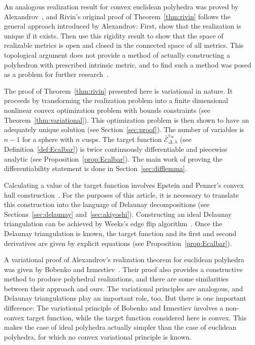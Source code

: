 \documentclass[a4paper, 11pt]{article}
\newcommand{\Ecal}{\mathcal{E}}
\newcommand{\Ecalbar}{\bar{\Ecal}}
\theoremstyle{plain}
\theoremstyle{definition}
\begin{document}
An analogous realization result for convex euclidean polyhedra was
proved by Alexandrov~\cite[pp.~99--100]{alexandrov05:_convex}, and
Rivin's original proof of Theorem~\ref{thm:rivin} follows the general
approach introduced by Alexandrov: First, show that the realization is
unique if it exists. Then use this rigidity result to show that the
space of realizable metrics is open and closed in the connected space
of all metrics. This topological argument does not provide a method of
actually constructing a polyhedron with prescribed intrinsic metric,
and to find such a method was posed as a problem for further
research~\cite{rivin94:_intrin}.

The proof of Theorem~\ref{thm:rivin} presented here is variational in nature. It proceeds by
transforming the realization problem into a finite dimensional
nonlinear convex optimization problem with bounds constraints (see
Theorem~\ref{thm:variational}). This optimization problem is then
shown to have an adequately unique solution (see Section~\ref{sec:proof}). The number of variables is $n-1$ for a
sphere with $n$ cusps. The target function
$\Ecalbar^{v_{\infty}}_{\Delta,\lambda}$ (see Definition~\ref{def:Ecalbar}) is twice continuously
differentiable and piecewise analytic (see
Proposition~\ref{prop:Ecalbar}). The main work of proving the
differentiability statement is done in Section~\ref{sec:difflemma}.

Calculating a value of the target
function involves Epstein and Penner's convex hull
construction~\cite{epstein88,penner87,penner12}. For the purposes of
this article, it is necessary to translate this construction into the
language of Delaunay decompositions (see Sections~\ref{sec:delaunay}
and~\ref{sec:akiyoshi}). Constructing an ideal Delaunay triangulation
can be achieved by Weeks's edge flip algorithm~\cite{weeks93}. Once the
Delaunay triangulation is known, the target function and its first and
second derivatives are given by explicit equations (see
Proposition~\ref{prop:Ecalbar}).

A variational proof of Alexandrov's realization theorem for euclidean
polyhedra was given by Bobenko and
Izmestiev~\cite{bobenko08:_alexan_delaun}. Their proof also provides a
constructive method to produce polyhedral realizations, and there are
some similarities between their approach and ours. The variational
principles are analogous, and Delaunay triangulations play an
important role, too. But there is one important difference: The
variational principle of Bobenko and Izmestiev involves a non-convex
target function, while the target function considered here is
convex. This makes the case of ideal polyhedra actually simpler than
the case of euclidean polyhedra, for which no convex variational
principle is known.
\end{document}
